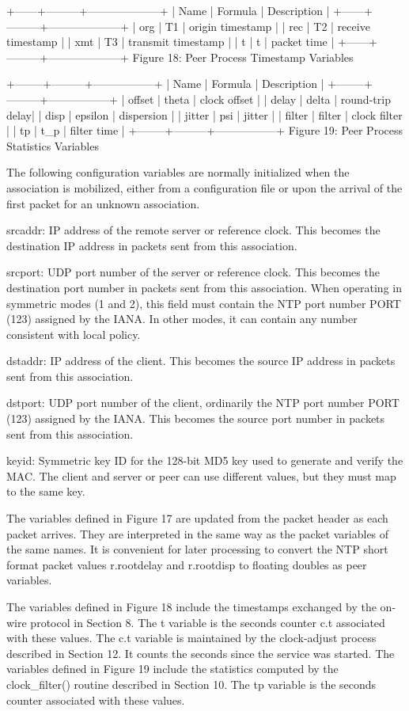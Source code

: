 +------+---------+--------------------+
| Name | Formula | Description |
+------+---------+--------------------+
| org | T1 | origin timestamp |
| rec | T2 | receive timestamp |
| xmt | T3 | transmit timestamp |
| t | t | packet time |
+------+---------+--------------------+
Figure 18: Peer Process Timestamp Variables

+--------+---------+-----------------+
| Name | Formula | Description |
+--------+---------+-----------------+
| offset | theta | clock offset |
| delay | delta | round-trip delay|
| disp | epsilon | dispersion |
| jitter | psi | jitter |
| filter | filter | clock filter |
| tp | t\_p | filter time |
+--------+---------+-----------------+
Figure 19: Peer Process Statistics Variables

The following configuration variables are normally initialized when
the association is mobilized, either from a configuration file or
upon the arrival of the first packet for an unknown association.

srcaddr: IP address of the remote server or reference clock. This
becomes the destination IP address in packets sent from this
association.

srcport: UDP port number of the server or reference clock. This
becomes the destination port number in packets sent from this
association. When operating in symmetric modes (1 and 2), this field
must contain the NTP port number PORT (123) assigned by the IANA. In
other modes, it can contain any number consistent with local policy.

dstaddr: IP address of the client. This becomes the source IP
address in packets sent from this association.

dstport: UDP port number of the client, ordinarily the NTP port
number PORT (123) assigned by the IANA. This becomes the source port
number in packets sent from this association.

keyid: Symmetric key ID for the 128-bit MD5 key used to generate and
verify the MAC. The client and server or peer can use different
values, but they must map to the same key.

The variables defined in Figure 17 are updated from the packet header
as each packet arrives. They are interpreted in the same way as the
packet variables of the same names. It is convenient for later
processing to convert the NTP short format packet values r.rootdelay
and r.rootdisp to floating doubles as peer variables.

The variables defined in Figure 18 include the timestamps exchanged
by the on-wire protocol in Section 8. The t variable is the seconds
counter c.t associated with these values. The c.t variable is
maintained by the clock-adjust process described in Section 12. It
counts the seconds since the service was started. The variables
defined in Figure 19 include the statistics computed by the
clock\_filter() routine described in Section 10. The tp variable is
the seconds counter associated with these values.


